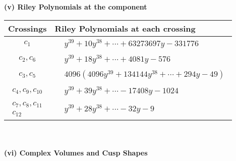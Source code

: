 \documentclass[1p]{elsarticle_modified}
\theoremstyle{definition}
\begin{document}
\newpage\renewcommand{\arraystretch}{1}
\flushleft \textbf{(v) Riley Polynomials at the component}\newline \\
\begin{tabular}{m{50pt}|m{274pt}}
Crossings & \hspace{64pt}Riley Polynomials at each crossing \\
\hline $$\begin{aligned}c_{1}\end{aligned}$$&$\begin{aligned}
&y^{39}+10 y^{38}+\cdots+63273697 y-331776
\end{aligned}$\\
\hline $$\begin{aligned}c_{2},c_{6}\end{aligned}$$&$\begin{aligned}
&y^{39}+18 y^{38}+\cdots+4081 y-576
\end{aligned}$\\
\hline $$\begin{aligned}c_{3},c_{5}\end{aligned}$$&$\begin{aligned}
&4096(4096 y^{39}+134144 y^{38}+\cdots+294 y-49)
\end{aligned}$\\
\hline $$\begin{aligned}c_{4},c_{9},c_{10}\end{aligned}$$&$\begin{aligned}
&y^{39}+39 y^{38}+\cdots-17408 y-1024
\end{aligned}$\\
\hline $$\begin{aligned}c_{7},c_{8},c_{11}\\c_{12}\end{aligned}$$&$\begin{aligned}
&y^{39}+28 y^{38}+\cdots-32 y-9
\end{aligned}$\\
\hline
\end{tabular}\\~\\
\newpage\flushleft \textbf{(vi) Complex Volumes and Cusp Shapes}
\end{document}
